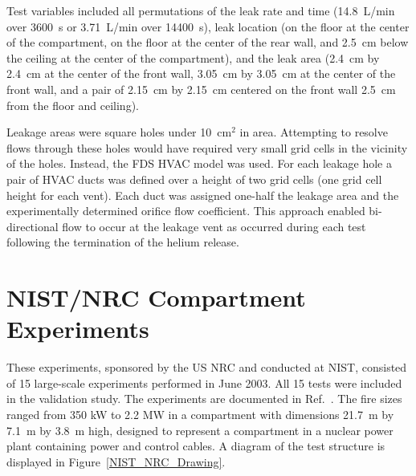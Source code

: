 Test variables included all permutations of the leak rate and time (14.8~L/min over 3600~s or 3.71~L/min over 14400~s), leak location (on the floor at the center of the compartment, on the floor at the center of the rear wall, and 2.5~cm below the ceiling at the center of the compartment), and the leak area (2.4~cm by 2.4~cm at the center of the front wall, 3.05~cm by 3.05~cm at the center of the front wall, and a pair of 2.15~cm by 2.15~cm centered on the front wall 2.5~cm from the floor and ceiling).

Leakage areas were square holes under 10~cm$^2$ in area.  Attempting to resolve flows through these holes would have required very small grid cells in the vicinity of the holes.  Instead, the FDS HVAC model was used.  For each leakage hole a pair of HVAC ducts was defined over a height of two grid cells (one grid cell height for each vent).  Each duct was assigned one-half the leakage area and the experimentally determined orifice flow coefficient. This approach enabled bi-directional flow to occur at the leakage vent as occurred during each test following the termination of the helium release.



\section{NIST/NRC Compartment Experiments}
\label{NIST_NRC_Description}

These experiments, sponsored by the US NRC and conducted at NIST, consisted of 15 large-scale experiments performed in June 2003. All 15 tests were included in the validation study. The experiments are documented in Ref.~\cite{Hamins:SP1013-1}. The fire sizes ranged from 350 kW to 2.2 MW in a compartment with dimensions 21.7~m by 7.1~m by 3.8~m high, designed to represent a compartment in a nuclear power plant containing power and control cables. A diagram of the test structure is displayed in Figure~\ref{NIST_NRC_Drawing}.

